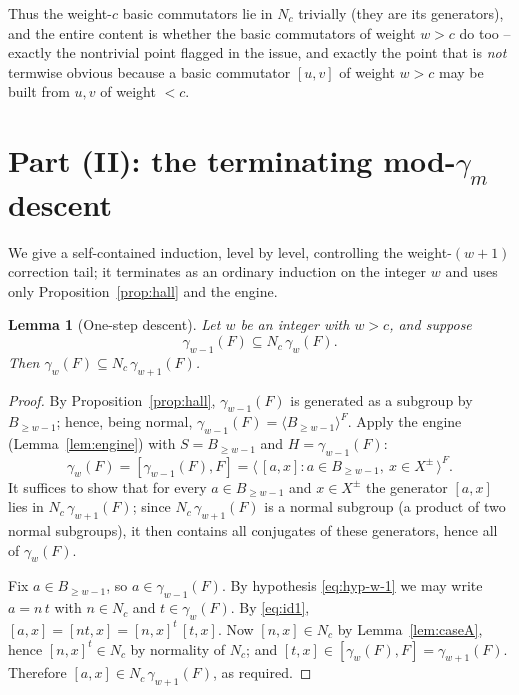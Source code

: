 \documentclass{amsart}
\newtheorem{lemma}{Lemma}
\theoremstyle{definition}
\theoremstyle{remark}
\begin{document}
\noindent
Thus the weight-$c$ basic commutators lie in $N_c$ trivially (they are its
generators), and the entire content is whether the basic commutators of weight
$w>c$ do too -- exactly the nontrivial point flagged in the issue, and exactly the
point that is \emph{not} termwise obvious because a basic commutator $[u,v]$ of
weight $w>c$ may be built from $u,v$ of weight $<c$.

\section{Part (II): the terminating mod-$\gamma_m$ descent}\label{sec:moddescent}

We give a self-contained induction, level by level, controlling the
weight-$(w{+}1)$ correction tail; it terminates as an ordinary induction on the
integer $w$ and uses only Proposition~\ref{prop:hall} and the engine.

\begin{lemma}[One-step descent]\label{lem:onestep}
Let $w$ be an integer with $w>c$, and suppose
\begin{equation}\label{eq:hyp-w-1}
\gamma_{w-1}(F)\subseteq N_c\,\gamma_{w}(F).
\end{equation}
Then $\gamma_{w}(F)\subseteq N_c\,\gamma_{w+1}(F)$.
\end{lemma}

\begin{proof}
By Proposition~\ref{prop:hall}, $\gamma_{w-1}(F)$ is generated as a subgroup by
$B_{\ge w-1}$; hence, being normal, $\gamma_{w-1}(F)=\langle
B_{\ge w-1}\rangle^{F}$. Apply the engine (Lemma~\ref{lem:engine}) with
$S=B_{\ge w-1}$ and $H=\gamma_{w-1}(F)$:
\[
\gamma_w(F)=[\gamma_{w-1}(F),F]
=\big\langle\,[a,x] : a\in B_{\ge w-1},\ x\in X^{\pm}\,\big\rangle^{F}.
\]
It suffices to show that for every $a\in B_{\ge w-1}$ and $x\in X^{\pm}$ the
generator $[a,x]$ lies in $N_c\,\gamma_{w+1}(F)$; since $N_c\,\gamma_{w+1}(F)$ is a
normal subgroup (a product of two normal subgroups), it then contains all
conjugates of these generators, hence all of $\gamma_w(F)$.

Fix $a\in B_{\ge w-1}$, so $a\in\gamma_{w-1}(F)$. By hypothesis
\eqref{eq:hyp-w-1} we may write $a=n\,t$ with $n\in N_c$ and $t\in\gamma_w(F)$.
By \eqref{eq:id1}, $[a,x]=[nt,x]=[n,x]^{t}\,[t,x]$. Now $[n,x]\in N_c$ by
Lemma~\ref{lem:caseA}, hence $[n,x]^{t}\in N_c$ by normality of $N_c$; and
$[t,x]\in[\gamma_w(F),F]=\gamma_{w+1}(F)$. Therefore $[a,x]\in
N_c\,\gamma_{w+1}(F)$, as required.
\end{proof}
\end{document}
